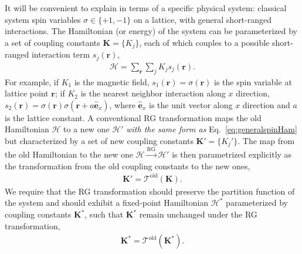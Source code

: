 \documentclass[aps,prr,reprint,superscriptaddress,floatfix]{revtex4-2}
\begin{document}
It will be convenient to explain in terms of a specific physical system: classical system spin variables $\sigma \in \{+1, -1\}$ on a lattice, with general short-ranged interactions.
The Hamiltonian (or energy) of the system can be parameterized by a set of coupling constants $\mathbf{K} = \{K_j\}$, each of which couples to a possible short-ranged interaction term $s_j(\mathbf{r})$,
%
\begin{align}\label{eq:generalspinHam}
    \mathcal{H} = \sum_{\mathbf{r}} \sum_{j} K_j s_j(\mathbf{r}).
\end{align}
%
For example, if $K_1$ is the magnetic field, $s_1(\mathbf{r}) = \sigma(\mathbf{r})$ is the spin variable at lattice point $\mathbf{r}$; if $K_2$ is the nearest neighbor interaction along $x$ direction, $s_2(\mathbf{r}) = \sigma(\mathbf{r})\sigma(\mathbf{r} + a\hat{\mathbf{e}}_x)$, where $\hat{\mathbf{e}}_x$ is the unit vector along $x$ direction and $a$ is the lattice constant. 
A conventional RG transformation maps the old Hamiltonian $\mathcal{H}$ to a new one $\mathcal{H}'$ \textit{with the same form as} Eq.~\eqref{eq:generalspinHam} but characterized by a set of new coupling constants $\mathbf{K}' = \{ K_j'\}$. 
The map from the old Hamiltonian to the new one $\mathcal{H} \xrightarrow{\text{RG}} \mathcal{H}'$ is then parametrized explicitly as the transformation from the old coupling constants to the new ones,
%
\begin{align}\label{eq:oldRGK}
    \mathbf{K}' = \mathcal{T}^{\text{old}}\left(\mathbf{K}\right).
\end{align}
%
We require that the RG transformation should preserve the partition function of the system and should exhibit a fixed-point Hamiltonian $\mathcal{H}^{*}$ parameterized by coupling constants $\mathbf{K}^{*}$, such that $\mathbf{K}^{*}$ remain unchanged under the RG transformation,
%
\begin{align}\label{eq:oldRGKstar}
    \mathbf{K}^{*} =
    \mathcal{T}^{\text{old}}\left(\mathbf{K}^{*}\right).
\end{align}
%
\end{document}
